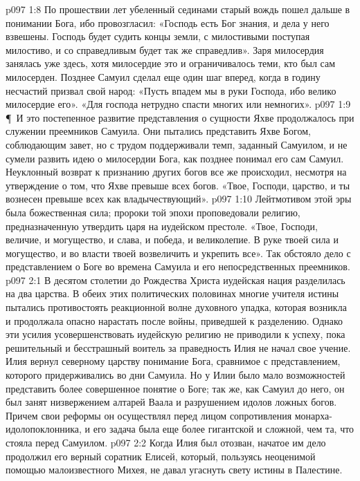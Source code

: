 \vs p097 1:8 По прошествии лет убеленный сединами старый вождь пошел дальше в понимании Бога, ибо провозгласил: «Господь есть Бог знания, и дела у него взвешены. Господь будет судить концы земли, с милостивыми поступая милостиво, и со справедливым будет так же справедлив». Заря милосердия занялась уже здесь, хотя милосердие это и ограничивалось теми, кто был сам милосерден. Позднее Самуил сделал еще один шаг вперед, когда в годину несчастий призвал свой народ: «Пусть впадем мы в руки Господа, ибо велико милосердие его». «Для господа нетрудно спасти многих или немногих».
\vs p097 1:9 \P\ И это постепенное развитие представления о сущности Яхве продолжалось при служении преемников Самуила. Они пытались представить Яхве Богом, соблюдающим завет, но с трудом поддерживали темп, заданный Самуилом, и не сумели развить идею о милосердии Бога, как позднее понимал его сам Самуил. Неуклонный возврат к признанию других богов все же происходил, несмотря на утверждение о том, что Яхве превыше всех богов. «Твое, Господи, царство, и ты вознесен превыше всех как владычествующий».
\vs p097 1:10 Лейтмотивом этой эры была божественная сила; пророки той эпохи проповедовали религию, предназначенную утвердить царя на иудейском престоле. «Твое, Господи, величие, и могущество, и слава, и победа, и великолепие. В руке твоей сила и могущество, и во власти твоей возвеличить и укрепить все». Так обстояло дело с представлением о Боге во времена Самуила и его непосредственных преемников.
\vs p097 2:1 В десятом столетии до Рождества Христа иудейская нация разделилась на два царства. В обеих этих политических половинах многие учителя истины пытались противостоять реакционной волне духовного упадка, которая возникла и продолжала опасно нарастать после войны, приведшей к разделению. Однако эти усилия усовершенствовать иудейскую религию не приводили к успеху, пока решительный и бесстрашный воитель за праведность Илия не начал свое учение. Илия вернул северному царству понимание Бога, сравнимое с представлением, которого придерживались во дни Самуила. Но у Илии было мало возможностей представить более совершенное понятие о Боге; так же, как Самуил до него, он был занят низвержением алтарей Ваала и разрушением идолов ложных богов. Причем свои реформы он осуществлял перед лицом сопротивления монарха\hyp{}идолопоклонника, и его задача была еще более гигантской и сложной, чем та, что стояла перед Самуилом.
\vs p097 2:2 Когда Илия был отозван, начатое им дело продолжил его верный соратник Елисей, который, пользуясь неоценимой помощью малоизвестного Михея, не давал угаснуть свету истины в Палестине.
